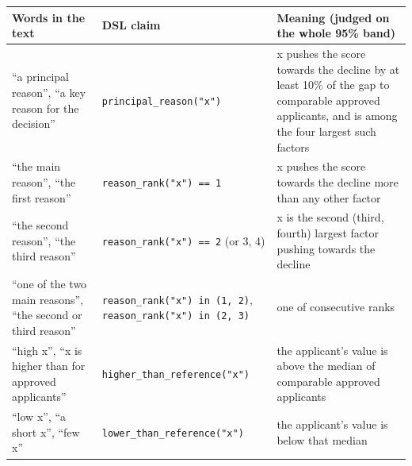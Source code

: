 \begin{tabular}{p{3.3cm}p{4.5cm}p{7cm}}
\toprule
\textbf{Words in the text} & \textbf{DSL claim} & \textbf{Meaning (judged on the whole 95\% band)} \\
\midrule
“a principal reason”, “a key reason for the decision” & \texttt{principal\_reason("x")} & x pushes the score towards the decline by at least 10\% of the gap to comparable approved applicants, and is among the four largest such factors \\
“the main reason”, “the first reason” & \texttt{reason\_rank("x") == 1} & x pushes the score towards the decline more than any other factor \\
“the second reason”, “the third reason” & \texttt{reason\_rank("x") == 2} (or 3, 4) & x is the second (third, fourth) largest factor pushing towards the decline \\
“one of the two main reasons”, “the second or third reason” & \texttt{reason\_rank("x") in (1, 2)}, \texttt{reason\_rank("x") in (2, 3)} & one of consecutive ranks \\
“high x”, “x is higher than for approved applicants” & \texttt{higher\_than\_reference("x")} & the applicant's value is above the median of comparable approved applicants \\
“low x”, “a short x”, “few x” & \texttt{lower\_than\_reference("x")} & the applicant's value is below that median \\
\bottomrule
\end{tabular}
